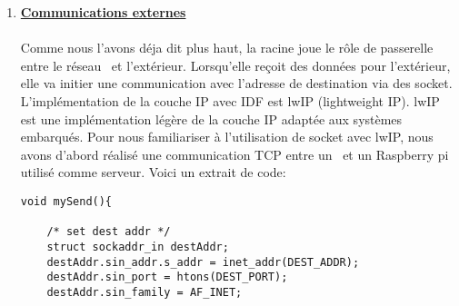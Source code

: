 \begin{enumerate}
\begin{alltt}
            \end{alltt}
            En rouge nous avons l'entête 802.11 où nous pouvons distinguer les adresses
            \mac\ du noeud source et du noeud de destination.
            En vert, Nous trouvons la couche  \textsc{llc} (logical link control)
            qui agit comme interface entre la couche \mac\ et la couche réseau.
            Enfin en bleu, le paquet \espmesh\ contenant:
            \begin{itemize}
                \item 8 octets que nous supposons être utilisés pour des options
                \item 6 octets utilisés pour l'adresse de destination (cette adresse est celle
                utilisée pour la racine du réseauenumerate).
                \item 6 octets utilisés pour l'adresse source
                \item 8 octets que nous supposons être utilisés pour des options
                \item 20 octets utilisés pour notre payload
            \end{itemize}
            La taille maximale du payload (\textsc{mps}) est de 1472 octets. Le total nous donne donc 1500
            octets ce qui correspond bien au \textsc{mtu} défini pour \espmesh.
            \footnote{Les constantes MTU et MPS sont définies dans le fichier \textbf{esp\_mesh.h}}
 
        \item \textbf{\underline{Communications externes}}\\
            \\
            Comme nous l'avons déja dit plus haut, la racine joue le rôle de passerelle entre le réseau \espmesh\ 
            et l'extérieur. Lorsqu'elle reçoit des données pour l'extérieur, elle va initier une communication avec l'adresse
            de destination via des socket. L'implémentation de la couche IP avec IDF est lwIP (lightweight IP). lwIP est
            une implémentation légère de la couche IP adaptée aux systèmes embarqués. Pour nous familiariser à l'utilisation
            de socket avec lwIP, nous avons d'abord réalisé une communication TCP entre un \esp\ et un Raspberry pi utilisé
            comme serveur. Voici un extrait de code: 
            \begin{verbatim}
void mySend(){

    /* set dest addr */
    struct sockaddr_in destAddr;
    destAddr.sin_addr.s_addr = inet_addr(DEST_ADDR);
    destAddr.sin_port = htons(DEST_PORT);
    destAddr.sin_family = AF_INET;


\end{verbatim}
\end{enumerate}
